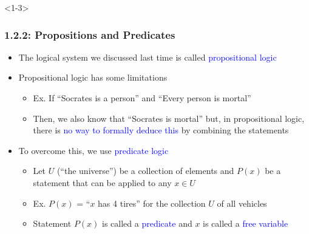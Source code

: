 \documentclass[10pt,english,aspectratio=169]{beamer}
\begin{document}
\begin{frame}<1-3> \frametitle{1.2.2: Propositions and Predicates}

\begin{itemize}
\setlength\itemsep{4mm}
\item<1-> The logical system  we discussed last time is called \textcolor{blue}{propositional logic}

\item<2-> Propositional logic has some limitations  \vspace{1mm}
\begin{itemize}
 \setlength\itemsep{1.5mm}
 \item Ex. If ``Socrates is a person'' and ``Every person is mortal''
 \item Then, we also know that ``Socrates is mortal'' but, in propositional logic, there is \textcolor{blue}{no way to formally deduce this} by combining the statements 
\end{itemize}

\item<3-> To overcome this, we use \textcolor{blue}{predicate logic} \vspace{1mm}
\begin{itemize}
 \setlength\itemsep{1.5mm}
 \item Let $U$ (``the universe'') be a collection of elements and $P(x)$ be a statement that can be applied to any $x\in U$
 \item Ex. $P(x)$ = ``$x$ has 4 tires'' for the collection $U$ of all vehicles
 \item Statement $P(x)$ is called a \textcolor{blue}{predicate} and $x$ is called a \textcolor{blue}{free variable}
\end{itemize}
\end{itemize}


\end{frame}
\end{document}
